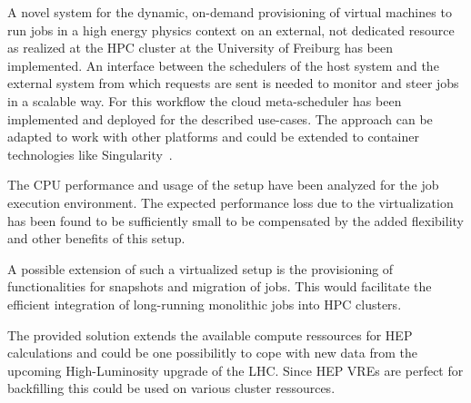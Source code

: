 A novel system for the dynamic, on-demand provisioning of virtual machines to run jobs
in a high energy physics context on an external, not dedicated resource as
realized at the HPC cluster \NEMO at the University of Freiburg has been
implemented. An interface between the schedulers of the
host system and the external system from which requests are sent is needed to
monitor and steer jobs in a scalable way. For this workflow the cloud meta-scheduler \Roced
has been implemented and deployed for the described use-cases.
The approach can be adapted to work with other platforms and could be extended to
container technologies like Singularity~\cite{VRE2017}.

The CPU performance and usage of the setup have been analyzed for the job execution environment.
The expected performance loss due to the virtualization has been found to be
sufficiently small to be compensated by the added flexibility and other benefits
of this setup.

A possible extension of such a virtualized setup is the provisioning of functionalities
for snapshots and migration of jobs. This would facilitate the efficient integration of
long-running monolithic jobs into HPC clusters.

The provided solution extends the available compute ressources for HEP calculations
and could be one possibilitly to cope with new data from the upcoming High-Luminosity
upgrade of the LHC. Since HEP VREs are perfect for backfilling this could be used on various
cluster ressources.
